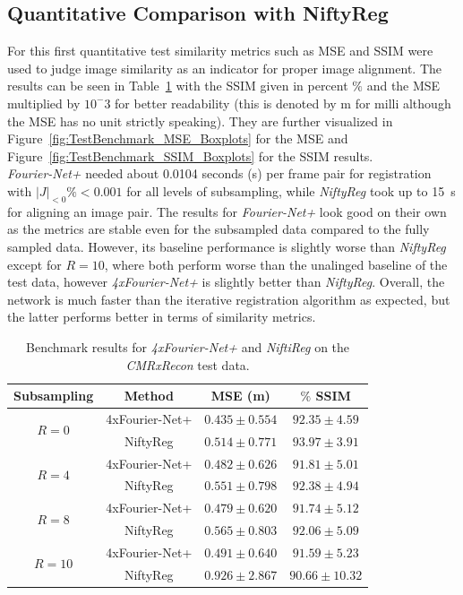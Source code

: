 \documentclass[english,version-2022-01]{uzl-thesis} %
\begin{document}
\subsection{Quantitative Comparison with NiftyReg}  \label{SubSec:ResultsQuantitativeComparisonNiftyReg}
For this first quantitative test similarity metrics such as MSE and SSIM were used to judge image similarity as an indicator for proper image alignment. The results can be seen in Table~\ref{tab:BenchmarkNiftyReg} with the SSIM given in percent $\%$ and the MSE multiplied by $10^-3$ for better readability (this is denoted by m for milli although the MSE has no unit strictly speaking). They are further visualized in Figure~\ref{fig:TestBenchmark_MSE_Boxplots} for the MSE and Figure~\ref{fig:TestBenchmark_SSIM_Boxplots} for the SSIM results. \\ \emph{Fourier-Net+} needed about 0.0104 seconds (s) per frame pair for registration with $|J|_{<0}\% < 0.001$ for all levels of subsampling, while \emph{NiftyReg} took up to 15~s for aligning an image pair. The results for \emph{Fourier-Net+} look good on their own as the metrics are stable even for the subsampled data compared to the fully sampled data. However, its baseline performance is slightly worse than \emph{NiftyReg} except for $R=10$, where both perform worse than the unalinged baseline of the test data, however \emph{4xFourier-Net+} is slightly better than \emph{NiftyReg}. Overall, the network is much faster than the iterative registration algorithm as expected, but the latter performs better in terms of similarity metrics.

\begin{table}[htpb]
	\centering
	\caption{Benchmark results for \emph{4xFourier-Net+} and \emph{NiftiReg} on the \emph{CMRxRecon} test data.}
	\label{tab:BenchmarkNiftyReg}
	\begin{tabular}{c c c c} %
		\toprule
		Subsampling & Method & MSE (m) & $\%$ SSIM \\
		
		\midrule
		\multirow{2}{*}{$R=0$} & 4xFourier-Net+ & $0.435 \pm 0.554$ &  $92.35 \pm 4.59$\\   
		 & NiftyReg & $0.514 \pm 0.771$ & $93.97 \pm 3.91$ \\
		
		\midrule
		\multirow{2}{*}{$R=4$} & 4xFourier-Net+ & $0.482 \pm 0.626$ & $91.81 \pm 5.01$\\ 
		 & NiftyReg & $0.551 \pm 0.798$ & $92.38 \pm 4.94$ \\
		
		\midrule
		\multirow{2}{*}{$R=8$} & 4xFourier-Net+ & $0.479 \pm 0.620$ & $91.74 \pm 5.12$\\ 
		 & NiftyReg & $0.565 \pm 0.803$ & $92.06 \pm 5.09$ \\

		\midrule
		\multirow{2}{*}{$R=10$} & 4xFourier-Net+ & $0.491 \pm 0.640$ & $91.59 \pm 5.23$\\  
		 & NiftyReg & $0.926 \pm 2.867$ & $90.66 \pm 10.32$ \\
		\bottomrule
	\end{tabular}
\end{table}
\end{document}
